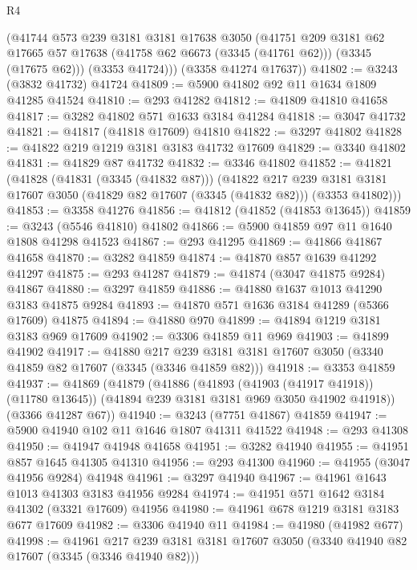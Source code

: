 \begin{lexlean}{R4}
\begin{coremodule}
        (@41744
          @573
          @239
          @3181
          @3181
          @17638
          @3050
          (@41751
            @209
            @3181
            @62
            @17665
            @57
            @17638
            (@41758 @62 @6673 (@3345 (@41761 @62)))
            (@3345 (@17675 @62)))
          (@3353 @41724)))
      (@3358 @41274 @17637))
@41802 := @3243 (@3832 @41732) @41724
@41809 := @5900 @41802 @92 @11 @1634 @1809 @41285 @41524
@41810 := @293 @41282
@41812 := @41809 @41810 @41658
@41817 := @3282 @41802 @571 @1633 @3184 @41284
@41818 := @3047 @41732
@41821 := @41817 (@41818 @17609) @41810
@41822 := @3297 @41802
@41828 := @41822 @219 @1219 @3181 @3183 @41732 @17609
@41829 := @3340 @41802
@41831 := @41829 @87 @41732
@41832 := @3346 @41802
@41852 := @41821
    (@41828
      (@41831 (@3345 (@41832 @87)))
      (@41822
        @217
        @239
        @3181
        @3181
        @17607
        @3050
        (@41829 @82 @17607 (@3345 (@41832 @82)))
        (@3353 @41802)))
@41853 := @3358 @41276
@41856 := @41812 (@41852 (@41853 @13645))
@41859 := @3243 (@5546 @41810) @41802
@41866 := @5900 @41859 @97 @11 @1640 @1808 @41298 @41523
@41867 := @293 @41295
@41869 := @41866 @41867 @41658
@41870 := @3282 @41859
@41874 := @41870 @857 @1639 @41292 @41297
@41875 := @293 @41287
@41879 := @41874 (@3047 @41875 @9284) @41867
@41880 := @3297 @41859
@41886 := @41880 @1637 @1013 @41290 @3183 @41875 @9284
@41893 := @41870 @571 @1636 @3184 @41289 (@5366 @17609) @41875
@41894 := @41880 @970
@41899 := @41894 @1219 @3181 @3183 @969 @17609
@41902 := @3306 @41859 @11 @969
@41903 := @41899 @41902
@41917 := @41880
    @217
    @239
    @3181
    @3181
    @17607
    @3050
    (@3340 @41859 @82 @17607 (@3345 (@3346 @41859 @82)))
@41918 := @3353 @41859
@41937 := @41869
    (@41879
      (@41886
        (@41893 (@41903 (@41917 @41918)) (@11780 @13645))
        (@41894 @239 @3181 @3181 @969 @3050 @41902 @41918))
      (@3366 @41287 @67))
@41940 := @3243 (@7751 @41867) @41859
@41947 := @5900 @41940 @102 @11 @1646 @1807 @41311 @41522
@41948 := @293 @41308
@41950 := @41947 @41948 @41658
@41951 := @3282 @41940
@41955 := @41951 @857 @1645 @41305 @41310
@41956 := @293 @41300
@41960 := @41955 (@3047 @41956 @9284) @41948
@41961 := @3297 @41940
@41967 := @41961 @1643 @1013 @41303 @3183 @41956 @9284
@41974 := @41951 @571 @1642 @3184 @41302 (@3321 @17609) @41956
@41980 := @41961 @678 @1219 @3181 @3183 @677 @17609
@41982 := @3306 @41940 @11
@41984 := @41980 (@41982 @677)
@41998 := @41961
    @217
    @239
    @3181
    @3181
    @17607
    @3050
    (@3340 @41940 @82 @17607 (@3345 (@3346 @41940 @82)))

\end{coremodule}
\end{lexlean}
